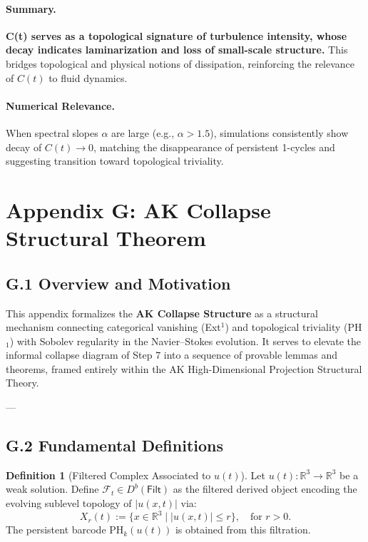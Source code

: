 \documentclass[11pt]{article}
\theoremstyle{definition}
\newtheorem{definition}[theorem]{Definition}
\begin{document}
\paragraph{Summary.} \textbf{C(t) serves as a topological signature of turbulence intensity, whose decay indicates laminarization and loss of small-scale structure.} This bridges topological and physical notions of dissipation, reinforcing the relevance of \( C(t) \) to fluid dynamics.

\paragraph{Numerical Relevance.} When spectral slopes \( \alpha \) are large (e.g., \( \alpha > 1.5 \)), simulations consistently show decay of \( C(t) \to 0 \), matching the disappearance of persistent 1-cycles and suggesting transition toward topological triviality.



\section*{Appendix G: AK Collapse Structural Theorem}

\subsection*{G.1 Overview and Motivation}

This appendix formalizes the \textbf{AK Collapse Structure} as a structural mechanism connecting categorical vanishing (Ext$^1$) and topological triviality (PH$_1$) with Sobolev regularity in the Navier–Stokes evolution.  
It serves to elevate the informal collapse diagram of Step 7 into a sequence of provable lemmas and theorems, framed entirely within the AK High-Dimensional Projection Structural Theory.

---

\subsection*{G.2 Fundamental Definitions}

\begin{definition}[Filtered Complex Associated to $u(t)$]
Let $u(t): \mathbb{R}^3 \to \mathbb{R}^3$ be a weak solution.  
Define $\mathcal{F}_t \in D^b(\mathsf{Filt})$ as the filtered derived object encoding the evolving sublevel topology of $|u(x,t)|$ via:
\[
X_r(t) := \{ x \in \mathbb{R}^3 \mid |u(x,t)| \leq r \}, \quad \text{for } r > 0.
\]
The persistent barcode $\mathrm{PH}_k(u(t))$ is obtained from this filtration.
\end{definition}
\end{document}
